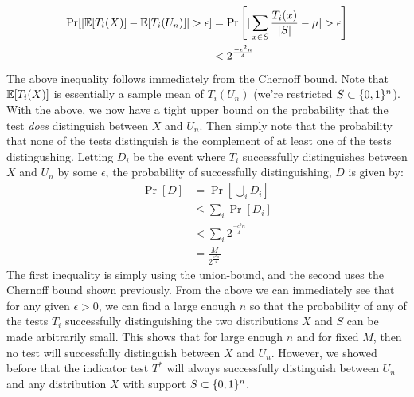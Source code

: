 \documentclass{article}
\begin{document}
\begin{enumerate}[noitemsep,topsep=\mdcompacttopsep]
\begin{itemize}[noitemsep,topsep=\mdcompacttopsep]
\[\begin{aligned}
\Pr[|\mathbb{E}[T_i(X)] - \mathbb{E}[T_i(U_n)]|  > \epsilon ] &= \Pr \left[ |\sum_{x \in S} \frac{T_i(x)}{|S|}  - \mu | > \epsilon \right]  \\
&< 2^{\frac{-\epsilon^2 n}{4}}
\end{aligned}
\]%
The above inequality follows immediately from the Chernoff bound. Note that $\mathbb{E}[T_i(X)]$ is essentially
a sample mean of $T_i(U_n)$ (we're restricted $S \subset \{0,1\}^n$). With the above, we now have a tight
upper bound on the probability that the test \emph{does} distinguish between $X$ and $U_n$. Then simply note
that the probability that none of the tests distinguish is the complement of at least one of the tests
distingushing. Letting $D_i$ be the event where $T_i$ successfully distinguishes between $X$ and $U_n$
by some $\epsilon$, the probability of successfully distinguishing, $D$ is given by:
\noindent\noindent\[%
\begin{aligned}
\Pr[D] &= \Pr[ \bigcup_i D_i ] \\
&\leq \sum_{i} \Pr[D_i] \\
&< \sum_{i} 2^{\frac{-\epsilon^2 n}{4}} \\
&= \frac{M}{2^{\frac{\epsilon^2 n}{4}}} 
\end{aligned}
\]%
The first inequality is simply using the union-bound, and the second uses the Chernoff bound shown
previously. From the above we can immediately see that for any given $\epsilon > 0$, we can find
a large enough $n$ so that the probability of any of the tests $T_i$ successfully distinguishing 
the two distributions $X$ and $S$ can be made arbitrarily small. This shows that for large enough $n$
and for fixed $M$, then no test will successfully distinguish between $X$ and $U_n$. However, we showed
before that the indicator test $T^*$ will always successfully distinguish between $U_n$ and any distribution
$X$ with support $S \subset \{0,1\} ^n$. 
\mdfloatright{\ensuremath{\Box}}%
\end{itemize}%
\end{enumerate}%
\end{document}
